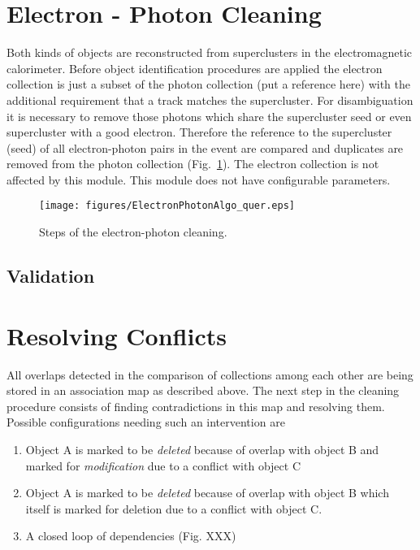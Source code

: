 \documentclass{cmspaper}
\begin{document}
\section{Electron - Photon Cleaning}
Both kinds of objects are reconstructed from superclusters in the
electromagnetic calorimeter. Before object identification procedures are applied
the electron collection is just a subset of the photon collection (put a
reference here) with the additional requirement that a track matches the
supercluster. For disambiguation it is necessary to remove those photons which
share the supercluster seed or even supercluster with a good electron.
Therefore the reference to the supercluster (seed) of all electron-photon pairs
in the event are compared and duplicates are removed from the photon collection
(Fig.~\ref{fig:EPCleaning}). The electron collection is not affected by this
module. This module does not have configurable parameters.

\begin{figure}[hbt]
\begin{center}
\texttt{[image: figures/ElectronPhotonAlgo\_quer.eps]}
\caption{Steps of the electron-photon cleaning.}
\label{fig:EPCleaning}
\end{center}
\end{figure}

\subsection{Validation}


\section{Resolving Conflicts}
\label{mapReso}
All overlaps detected in the comparison of collections among each other are
being stored in an association map as described above. The next step in the cleaning procedure
consists of finding contradictions in this map and resolving them.
Possible configurations needing such an intervention are
\begin{enumerate}
    \item Object A is marked to be \textit{deleted} because of overlap with
	object B and marked for \textit{modification} due to a conflict with
	object C
    \item Object A is marked to be \textit{deleted} because of overlap with object B
	which itself is marked for deletion due to a conflict with object C.
    \item A closed loop of dependencies (Fig. XXX) %
\end{enumerate}
\end{document}
